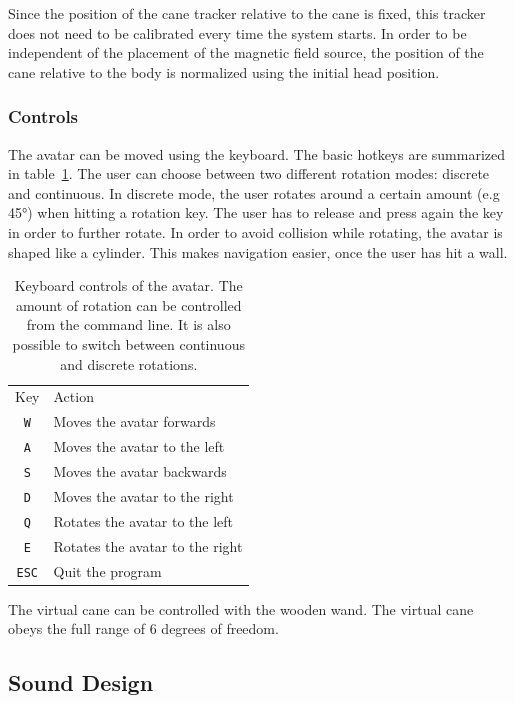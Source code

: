 \documentclass{sig-alternate}
\begin{document}
Since the position of the cane tracker relative to the cane is fixed, this
tracker does not need to be calibrated every time the system starts. In order to
be independent of the placement of the magnetic field source, the position of
the cane relative to the body is normalized using the initial head position.

\subsubsection{Controls}

The avatar can be moved using the keyboard. The basic hotkeys are summarized in
table~\ref{tab:keys}. The user can choose between two different rotation modes:
discrete and continuous. In discrete mode, the user rotates around a certain
amount (e.g \ang{45}) when hitting a rotation key. The user has to release and
press again the key in order to further rotate. In order to avoid collision
while rotating, the avatar is shaped like a cylinder. This makes navigation
easier, once the user has hit a wall.

\begin{table}[tb]
\centering
\caption{Keyboard controls of the avatar. The amount of rotation can be
controlled from the command line. It is also possible to switch between
continuous and discrete rotations.}
\label{tab:keys}
\vspace{1em}
\begin{tabular}{@{}cl@{}}
\bottomrule
Key & Action\\
\cmidrule(r){1-1} \cmidrule(l){2-2}
\texttt{W} & Moves the avatar forwards\\
\texttt{A} & Moves the avatar to the left\\
\texttt{S} & Moves the avatar backwards\\
\texttt{D} & Moves the avatar to the right\\
\texttt{Q} & Rotates the avatar to the left\\
\texttt{E} & Rotates the avatar to the right\\
\texttt{ESC} & Quit the program\\
\bottomrule
\end{tabular}
\end{table}

The virtual cane can be controlled with the wooden wand. The virtual cane
obeys the full range of 6 degrees of freedom.

\subsection{Sound Design}
\end{document}
